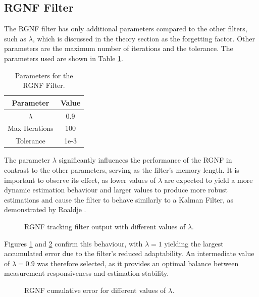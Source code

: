 \subsection{RGNF Filter}
The \ac{RGNF} filter has only additional parameters compared to the other filters, such as \(\lambda\), which is discussed in the theory section as the forgetting factor. Other parameters are the maximum number of iterations and the tolerance. The parameters used are shown in Table \ref{tablergnf}.

\begin{table}[H]
    \centering
    \caption{Parameters for the RGNF Filter.}
    \label{tablergnf}
    \begin{tabular}{c|c}
        \toprule
        Parameter & Value \\
        \midrule
        \( \lambda \) & 0.9 \\
        Max Iterations & 100 \\
        Tolerance & 1e-3 \\
        \bottomrule
    \end{tabular}
\end{table}

The parameter \(\lambda\) significantly influences the performance of the \ac{RGNF} in contrast to the other parameters, serving as the filter's memory length. It is important to observe its effect, as lower values of \(\lambda\) are expected to yield a more dynamic estimation behaviour and larger values to produce more robust estimations and cause the filter to behave similarly to a Kalman Filter, as demonstrated by Roaldje \cite{Nadjiasngar2012}. 
\begin{figure}[H]
    \centering
    
    \caption{RGNF tracking filter output with different values of \(\lambda\).}
    \label{fig:rgnf_results}
\end{figure}
Figures \ref{fig:rgnf_results} and \ref{fig:rgnf_cum_error} confirm this behaviour, with \(\lambda = 1\) yielding the largest accumulated error due to the filter's reduced adaptability. An intermediate value of \(\lambda = 0.9\) was therefore selected, as it provides an optimal balance between measurement responsiveness and estimation stability.

\begin{figure}[H]
    \centering
    
    \caption{RGNF cumulative error for different values of \(\lambda\).}
    \label{fig:rgnf_cum_error}
\end{figure}

